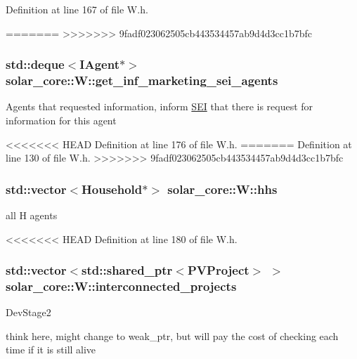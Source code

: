 Definition at line 167 of file W.\+h.

=======
>>>>>>> 9fadf023062505cb443534457ab9d4d3cc1b7bfc
\hypertarget{classsolar__core_1_1_w_a81b5469757f203c9619ff69323ac0f77}{}
\subsubsection[{get\+\_\+inf\+\_\+marketing\+\_\+sei\+\_\+agents}]{\setlength{\rightskip}{0pt plus 5cm}std\+::deque$<${\bf I\+Agent}$\ast$$>$ solar\+\_\+core\+::\+W\+::get\+\_\+inf\+\_\+marketing\+\_\+sei\+\_\+agents\hspace{0.3cm}{\ttfamily [protected]}}\label{classsolar__core_1_1_w_a81b5469757f203c9619ff69323ac0f77}
Agents that requested information, inform \hyperlink{classsolar__core_1_1_s_e_i}{S\+E\+I} that there is request for information for this agent 

<<<<<<< HEAD
Definition at line 176 of file W.\+h.
=======
Definition at line 130 of file W.\+h.
>>>>>>> 9fadf023062505cb443534457ab9d4d3cc1b7bfc

\hypertarget{classsolar__core_1_1_w_a17c012ff8b17890ed33923cec6d87be3}{}
\subsubsection[{hhs}]{\setlength{\rightskip}{0pt plus 5cm}std\+::vector$<${\bf Household}$\ast$$>$ solar\+\_\+core\+::\+W\+::hhs\hspace{0.3cm}{\ttfamily [protected]}}\label{classsolar__core_1_1_w_a17c012ff8b17890ed33923cec6d87be3}
all H agents 

<<<<<<< HEAD
Definition at line 180 of file W.\+h.

\hypertarget{classsolar__core_1_1_w_a1d35d6501eef6d673bd2b28e2c1724c4}{}
\subsubsection[{interconnected\+\_\+projects}]{\setlength{\rightskip}{0pt plus 5cm}std\+::vector$<$std\+::shared\+\_\+ptr$<${\bf P\+V\+Project}$>$ $>$ solar\+\_\+core\+::\+W\+::interconnected\+\_\+projects\hspace{0.3cm}{\ttfamily [protected]}}\label{classsolar__core_1_1_w_a1d35d6501eef6d673bd2b28e2c1724c4}
\begin{DoxyRefDesc}{Dev\+Stage2}
\item[\hyperlink{_dev_stage2__DevStage2000030}{Dev\+Stage2}]think here, might change to weak\+\_\+ptr, but will pay the cost of checking each time if it is still alive \end{DoxyRefDesc}


